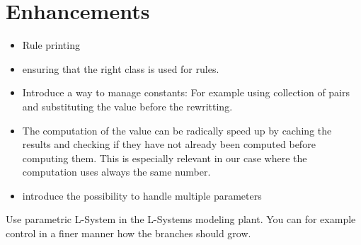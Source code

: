 \section{Enhancements}


\begin{itemize}
\item Rule printing
\item ensuring that the right class is used for rules. 

\item Introduce a way to manage constants:
For example using collection of pairs and substituting the value
before the rewritting.  

\item The computation of the value can be radically speed up by caching the results and checking if they have not already been computed before computing them. This is especially relevant in our case where the  computation uses always the same number. 

\item introduce the possibility to handle multiple parameters



 
\end{itemize}

\begin{exonofig}
Use parametric L-System  in the L-Systems modeling plant. You can for example
control in a finer manner how the branches should grow.
\end{exonofig}



\ifx\wholebook\relax\else\fi
